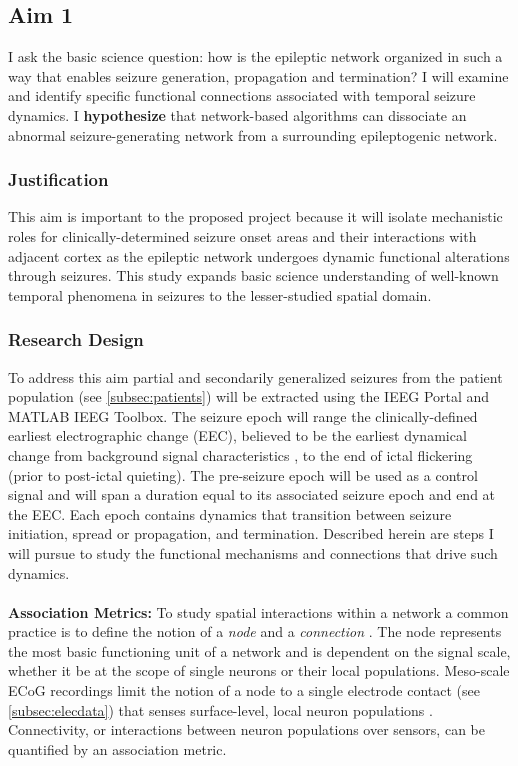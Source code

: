 \subsection{Aim 1}
I ask the basic science question: how is the epileptic network organized in such a way that enables seizure generation, propagation and termination? I will examine and identify specific functional connections associated with temporal seizure dynamics. I \textbf{hypothesize} that network-based algorithms can dissociate an abnormal seizure-generating network from a surrounding epileptogenic network.

\subsubsection{Justification}
This aim is important to the proposed project because it will isolate mechanistic roles for clinically-determined seizure onset areas and their interactions with adjacent cortex as the epileptic network undergoes dynamic functional alterations through seizures. This study expands basic science understanding of well-known temporal phenomena in seizures to the lesser-studied spatial domain.

\subsubsection{Research Design}
To address this aim partial and secondarily generalized seizures from the patient population (see \ref{subsec:patients}) will be extracted using the IEEG Portal and MATLAB IEEG Toolbox. The seizure epoch will range the clinically-defined earliest electrographic change (EEC), believed to be the earliest dynamical change from background signal characteristics \cite{litt2001epileptic}, to the end of ictal flickering (prior to post-ictal quieting). The pre-seizure epoch will be used as a control signal and will span a duration equal to its associated seizure epoch and end at the EEC. Each epoch contains dynamics that transition between seizure initiation, spread or propagation, and termination. Described herein are steps I will pursue to study the functional mechanisms and connections that drive such dynamics.
~\\
~\\
\textbf{Association Metrics:}
To study spatial interactions within a network a common practice is to define the notion of a \textit{node} and a \textit{connection} \cite{bullmore2011brain}. The node represents the most basic functioning unit of a network and is dependent on the signal scale, whether it be at the scope of single neurons or their local populations. Meso-scale ECoG recordings limit the notion of a node to a single electrode contact (see \ref{subsec:elecdata}) that senses surface-level, local neuron populations \cite{buzsaki2012origin}. Connectivity, or interactions between neuron populations over sensors, can be quantified by an association metric.

